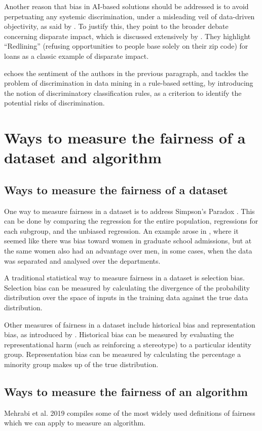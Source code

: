 \documentclass[conference]{IEEEtran}
\begin{document}
Another reason that bias in AI-based solutions should be addressed is to avoid perpetuating any systemic discrimination, under a misleading veil of data-driven objectivity, as said by \cite{d_Alessandro_2017}. To justify this, they point to the broader debate concerning disparate impact, which is discussed extensively by \cite{10.2307/24758720}. They highlight “Redlining” (refusing opportunities to people base solely on their zip code) for loans as a classic example of disparate impact.

\cite{10.1145/1401890.1401959} echoes the sentiment of the authors in the previous paragraph, and tackles the problem of discrimination in data mining in a rule-based setting, by introducing the notion of discriminatory classification rules, as a criterion to identify the potential risks of discrimination.

\section{Ways to measure the fairness of a dataset and algorithm}
\subsection{Ways to measure the fairness of a dataset}
One way to measure fairness in a dataset is to address Simpson's Paradox \cite{10.2307/2284382}. This can be done by comparing the regression for the entire population, regressions for each subgroup, and the unbiased regression. An example arose in \cite{Bickel398}, where it seemed like there was bias toward women in graduate school admissions, but at the same women also had an advantage over men, in some cases, when the data was separated and analysed over the departments.

A traditional statistical way to measure fairness in a dataset is selection bias. Selection bias can be measured by calculating the divergence of the probability distribution over the space of inputs in the training data against the true data distribution.

Other measures of fairness in a dataset include historical bias and representation bias, as introduced by \cite{DBLP:journals/corr/abs-1901-10002}. Historical bias can be measured by evaluating the representational harm (such as reinforcing a stereotype) to a particular identity group. Representation bias can be measured by calculating the percentage a minority group makes up of the true distribution. 

\subsection{Ways to measure the fairness of an algorithm}
Mehrabi et al. 2019 \cite{DBLP:journals/corr/abs-1908-09635} compiles some of the most widely used definitions of fairness which we can apply to measure an algorithm.
\end{document}
